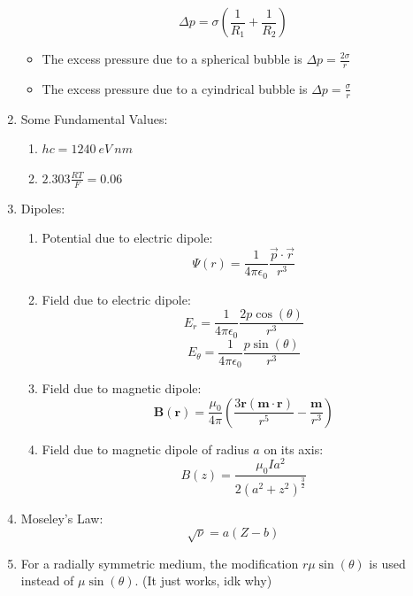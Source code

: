 \documentclass{article}
\numberwithin{equation}{section}
\numberwithin{figure}{section}
\begin{document}
\begin{enumerate}
\begin{equation}
	\Delta p= \sigma \left(\frac{1}{R_1}+\frac{1}{R_2}\right)
\end{equation}
		\begin{itemize}
			\item The excess pressure due to a spherical bubble is $\Delta p=\frac{2\sigma}{r}$
			\item The excess pressure due to a cyindrical bubble is $\Delta p=\frac{\sigma}{r}$
		\end{itemize}
	\item Some Fundamental Values:
		\begin{enumerate}
			\item $hc=1240 \ eV \ nm $
			\item $2.303 \frac{RT}{F}=0.06$
		\end{enumerate}
	\item Dipoles:
		\begin{enumerate}
			\item Potential due to electric dipole:
				\begin{equation}\Psi(r)=\frac{1}{4\pi\epsilon_0}\frac{\vec{p}\cdot\vec{r} }{r^3}\end{equation}
			\item Field due to electric dipole:
				\begin{equation}
					E_{r}=\frac{1}{4\pi\epsilon_0}\frac{2p\cos(\theta)}{r^3}
				\end{equation}
				\begin{equation}
					E_{\theta}=\frac{1}{4\pi\epsilon_0}\frac{p\sin(\theta)}{r^3}
				\end{equation}
			\item Field due to magnetic dipole:
				\begin{equation}
					\mathbf{B(r)}=\frac{\mu_0}{4\pi}\left(\frac{3\mathbf{r(m\cdot r)}}{r^5}-\frac{\mathbf{m}}{r^3}\right)
				\end{equation}
			\item Field due to magnetic dipole of radius $a$ on its axis:
				\begin{equation}
					B(z)=\frac{\mu_0 I a^2}{2 (a^2+z^2)^{\frac{3}{2}}}
				\end{equation}
		\end{enumerate}
	\item Moseley's Law:
		\begin{equation}
			\sqrt{\nu}=a(Z-b)
		\end{equation}
	\item For a radially symmetric medium, the modification $r \mu \sin(\theta)$ is used instead of $\mu \sin(\theta)$. (It just works, idk why)

\end{enumerate}
\end{document}
